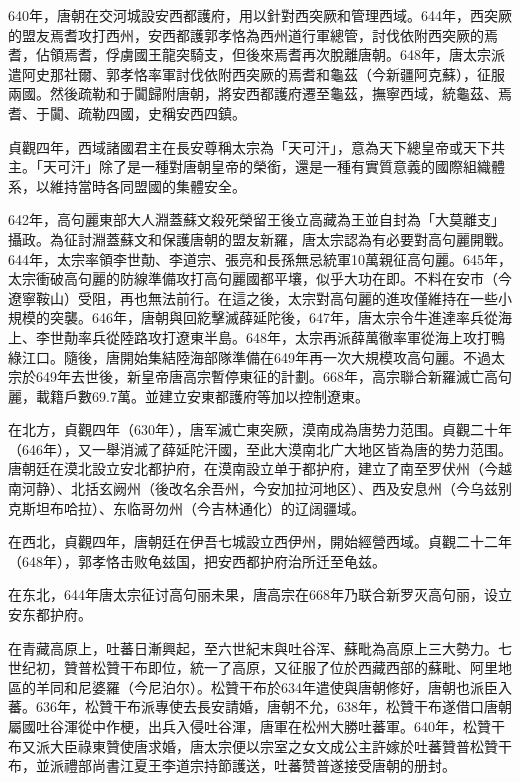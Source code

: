 640年，唐朝在交河城設安西都護府，用以針對西突厥和管理西域。644年，西突厥的盟友焉耆攻打西州，安西都護郭孝恪為西州道行軍總管，討伐依附西突厥的焉耆，佔領焉耆，俘虜國王龍突騎支，但後來焉耆再次脫離唐朝。648年，唐太宗派遣阿史那社爾、郭孝恪率軍討伐依附西突厥的焉耆和龜茲（今新疆阿克蘇），征服兩國。然後疏勒和于闐歸附唐朝，將安西都護府遷至龜茲，撫寧西域，統龜茲、焉耆、于闐、疏勒四國，史稱安西四鎮。

貞觀四年，西域諸國君主在長安尊稱太宗為「天可汗」，意為天下總皇帝或天下共主。「天可汗」除了是一種對唐朝皇帝的榮銜，還是一種有實質意義的國際組織體系，以維持當時各同盟國的集體安全。

642年，高句麗東部大人淵蓋蘇文殺死榮留王後立高藏為王並自封為「大莫離支」攝政。為征討淵蓋蘇文和保護唐朝的盟友新羅，唐太宗認為有必要對高句麗開戰。644年，太宗率領李世勣、李道宗、張亮和長孫無忌統軍10萬親征高句麗。645年，太宗衝破高句麗的防線準備攻打高句麗國都平壤，似乎大功在即。不料在安市（今遼寧鞍山）受阻，再也無法前行。在這之後，太宗對高句麗的進攻僅維持在一些小規模的突襲。646年，唐朝與回紇擊滅薛延陀後，647年，唐太宗令牛進達率兵從海上、李世勣率兵從陸路攻打遼東半島。648年，太宗再派薛萬徹率軍從海上攻打鴨綠江口。隨後，唐開始集結陸海部隊準備在649年再一次大規模攻高句麗。不過太宗於649年去世後，新皇帝唐高宗暫停東征的計劃。668年，高宗聯合新羅滅亡高句麗，載籍戶數69.7萬。並建立安東都護府等加以控制遼東。

在北方，貞觀四年（630年），唐军滅亡東突厥，漠南成為唐势力范围。貞觀二十年（646年），又一舉消滅了薛延陀汗國，至此大漠南北广大地区皆為唐的势力范围。唐朝廷在漠北設立安北都护府，在漠南設立单于都护府，建立了南至罗伏州（今越南河静）、北括玄阙州（後改名余吾州，今安加拉河地区）、西及安息州（今乌兹别克斯坦布哈拉）、东临哥勿州（今吉林通化）的辽阔疆域。

在西北，貞觀四年，唐朝廷在伊吾七城設立西伊州，開始經營西域。貞觀二十二年（648年），郭孝恪击败龟兹国，把安西都护府治所迁至龟兹。

在东北，644年唐太宗征讨高句丽未果，唐高宗在668年乃联合新罗灭高句丽，设立安东都护府。

在青藏高原上，吐蕃日漸興起，至六世紀末與吐谷浑、蘇毗為高原上三大勢力。七世纪初，贊普松贊干布即位，統一了高原，又征服了位於西藏西部的蘇毗、阿里地區的羊同和尼婆羅（今尼泊尔）。松贊干布於634年遣使與唐朝修好，唐朝也派臣入蕃。636年，松贊干布派專使去長安請婚，唐朝不允，638年，松贊干布遂借口唐朝屬國吐谷渾從中作梗，出兵入侵吐谷渾，唐軍在松州大勝吐蕃軍。640年，松贊干布又派大臣祿東贊使唐求婚，唐太宗便以宗室之女文成公主許嫁於吐蕃贊普松贊干布，並派禮部尚書江夏王李道宗持節護送，吐蕃赞普遂接受唐朝的册封。

